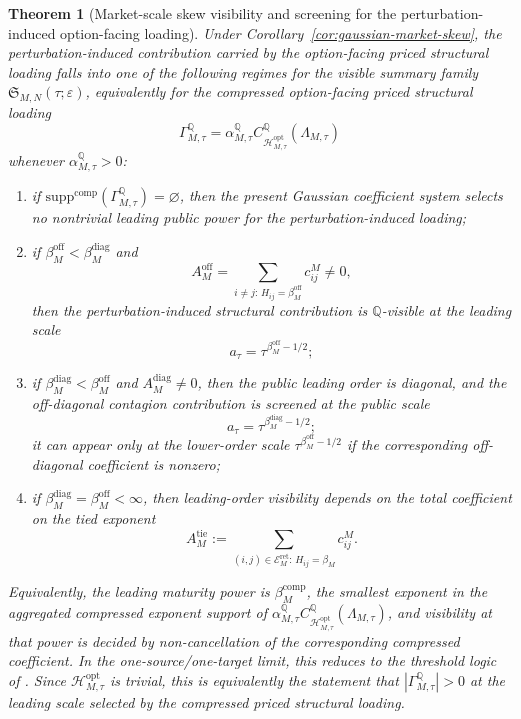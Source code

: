 \documentclass[11pt,a4paper]{amsart}
\theoremstyle{plain}
\newtheorem{theorem}{Theorem}[section]
\theoremstyle{definition}
\theoremstyle{remark}
\newcommand{\QQ}{\mathbb{Q}}
\newcommand{\cH}{\mathcal{H}}
\newcommand{\cE}{\mathcal{E}}
\begin{document}
\begin{theorem}[Market-scale skew visibility and screening for the perturbation-induced option-facing loading]\label{thm:market-visibility}
Under Corollary~\ref{cor:gaussian-market-skew}, the perturbation-induced contribution carried by the option-facing priced
structural loading falls into one of the following regimes
for the visible summary family \(\mathfrak S_{M,N}(\tau;\varepsilon)\), equivalently for the
compressed option-facing priced structural loading
\[
        \Gamma_{M,\tau}^\QQ
        =
        \alpha_{M,\tau}^\QQ
        C_{\cH_{M,\tau}^{\mathrm{opt}}}^\QQ(\Lambda_{M,\tau})
\]
whenever \(\alpha_{M,\tau}^\QQ>0\):
\begin{enumerate}[label=(\roman*)]
\item if \(\mathrm{supp}^{\mathrm{comp}}(\Gamma_{M,\tau}^\QQ)=\varnothing\), then the present
Gaussian coefficient system selects no nontrivial leading public power for the perturbation-induced
loading;
\item if \(\beta_M^{\mathrm{off}}<\beta_M^{\mathrm{diag}}\) and
\[
        A_M^{\mathrm{off}}
        =
        \sum_{i\neq j:\,H_{ij}=\beta_M^{\mathrm{off}}} c_{ij}^M
        \neq0,
\]
then the perturbation-induced structural contribution is \(\QQ\)-visible at the leading scale
\[
        a_\tau=\tau^{\beta_M^{\mathrm{off}}-1/2};
\]
\item if \(\beta_M^{\mathrm{diag}}<\beta_M^{\mathrm{off}}\) and \(A_M^{\mathrm{diag}}\neq0\), then
the public leading order is diagonal, and the off-diagonal contagion contribution is screened at
the public scale
\[
        a_\tau=\tau^{\beta_M^{\mathrm{diag}}-1/2};
\]
it can appear only at the lower-order scale \(\tau^{\beta_M^{\mathrm{off}}-1/2}\) if the
corresponding off-diagonal coefficient is nonzero;
\item if \(\beta_M^{\mathrm{diag}}=\beta_M^{\mathrm{off}}<\infty\), then leading-order visibility
depends on the total coefficient on the tied exponent
\[
        A_M^{\mathrm{tie}}
        :=
        \sum_{(i,j)\in\cE_M^{\mathrm{ret}}:\,H_{ij}=\beta_M}
        c_{ij}^M.
\]
\end{enumerate}
Equivalently, the leading maturity power is \(\beta_M^{\mathrm{comp}}\), the smallest exponent in
the aggregated compressed exponent support of
\(
        \alpha_{M,\tau}^\QQ C_{\cH_{M,\tau}^{\mathrm{opt}}}^\QQ(\Lambda_{M,\tau})
\),
and visibility at that power is decided by non-cancellation of the corresponding compressed
coefficient.  In the one-source/one-target limit, this reduces to the threshold logic of
\cite{vidal2026latent}.  Since \(\cH_{M,\tau}^{\mathrm{opt}}\) is trivial, this is equivalently the
statement that \(|\Gamma_{M,\tau}^\QQ|>0\) at the leading scale selected by the compressed priced
structural loading.
\end{theorem}
\end{document}
